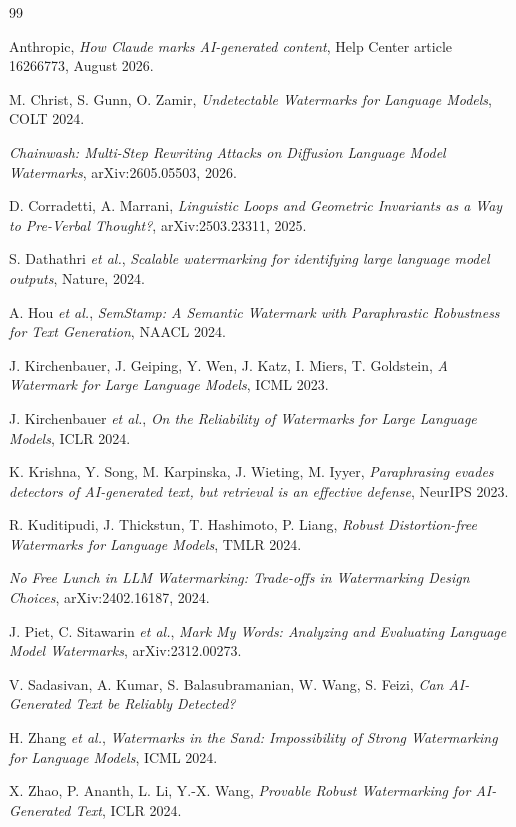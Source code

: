 \documentclass[11pt,a4paper]{article}
\theoremstyle{plain}
\theoremstyle{definition}
\numberwithin{equation}{section}
\begin{document}
\begin{thebibliography}{99}

 Anthropic, \emph{How Claude marks AI-generated
content}, Help Center article 16266773, August 2026.

 M. Christ, S. Gunn, O. Zamir, \emph{Undetectable
Watermarks for Language Models}, COLT 2024.

 \emph{Chainwash: Multi-Step Rewriting Attacks on
Diffusion Language Model Watermarks}, arXiv:2605.05503, 2026.

 D. Corradetti, A. Marrani, \emph{Linguistic Loops and
Geometric Invariants as a Way to Pre-Verbal Thought?},
arXiv:2503.23311, 2025.

 S. Dathathri \emph{et al.}, \emph{Scalable
watermarking for identifying large language model outputs},
Nature, 2024.

 A. Hou \emph{et al.}, \emph{SemStamp: A Semantic
Watermark with Paraphrastic Robustness for Text Generation},
NAACL 2024.

 J. Kirchenbauer, J. Geiping, Y. Wen, J. Katz, I. Miers,
T. Goldstein, \emph{A Watermark for Large Language Models}, ICML 2023.

 J. Kirchenbauer \emph{et al.}, \emph{On the Reliability
of Watermarks for Large Language Models}, ICLR 2024.

 K. Krishna, Y. Song, M. Karpinska, J. Wieting,
M. Iyyer, \emph{Paraphrasing evades detectors of AI-generated text, but
retrieval is an effective defense}, NeurIPS 2023.

 R. Kuditipudi, J. Thickstun, T. Hashimoto, P. Liang,
\emph{Robust Distortion-free Watermarks for Language Models},
TMLR 2024.

 \emph{No Free Lunch in LLM Watermarking: Trade-offs in
Watermarking Design Choices}, arXiv:2402.16187, 2024.

 J. Piet, C. Sitawarin \emph{et al.}, \emph{Mark My
Words: Analyzing and Evaluating Language Model Watermarks},
arXiv:2312.00273.

 V. Sadasivan, A. Kumar, S. Balasubramanian, W. Wang,
S. Feizi, \emph{Can AI-Generated Text be Reliably Detected?}

 H. Zhang \emph{et al.}, \emph{Watermarks in the Sand:
Impossibility of Strong Watermarking for Language Models}, ICML 2024.

 X. Zhao, P. Ananth, L. Li, Y.-X. Wang, \emph{Provable
Robust Watermarking for AI-Generated Text}, ICLR 2024.

\end{thebibliography}
\end{document}
